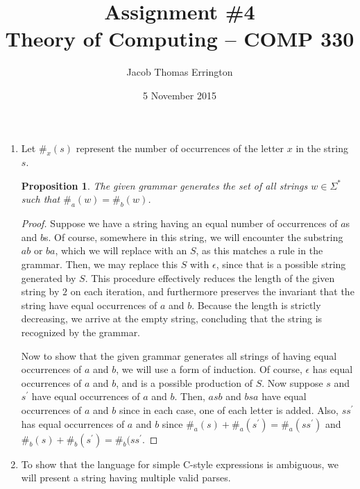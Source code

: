 \documentclass[letterpaper,11pt]{article}
\author{Jacob Thomas Errington}
\date{5 November 2015}
\title{Assignment \#4\\Theory of Computing -- COMP 330}
\newtheorem{proposition}{Proposition}
\begin{document}
\maketitle

\begin{enumerate}
    \item Let $\#_x(s)$ represent the number of occurrences of the letter $x$
        in the string $s$.

        \begin{proposition}
            The given grammar generates the set of all strings $w \in \Sigma^*$
            such that $\#_a(w) = \#_b(w)$.
        \end{proposition}

        \begin{proof}
            Suppose we have a string having an equal number of occurrences of
            $a$s and $b$s. Of course, somewhere in this string, we will
            encounter the substring $ab$ or $ba$, which we will replace with an
            $S$, as this matches a rule in the grammar. Then, we may replace
            this $S$ with $\epsilon$, since that is a possible string generated
            by $S$. This procedure effectively reduces the length of the given
            string by $2$ on each iteration, and furthermore preserves the
            invariant that the string have equal occurrences of $a$ and $b$.
            Because the length is strictly decreasing, we arrive at the empty
            string, concluding that the string is recognized by the grammar.

            Now to show that the given grammar generates all strings of having
            equal occurrences of $a$ and $b$, we will use a form of induction.
            Of course, $\epsilon$ has equal occurrences of $a$ and $b$, and is
            a possible production of $S$. Now suppose $s$ and $s^\prime$ have
            equal occurrences of $a$ and $b$. Then, $asb$ and $bsa$ have equal
            occurrences of $a$ and $b$ since in each case, one of each letter
            is added. Also, $ss^\prime$ has equal occurrences of $a$ and $b$
            since $\#_a(s) + \#_a(s^\prime) = \#_a(ss^\prime)$ and
            $\#_b(s) + \#_b(s^\prime) = \#_b(ss^\prime$.
        \end{proof}

    \item
        To show that the language for simple C-style expressions is ambiguous,
        we will present a string having multiple valid parses.


\end{enumerate}
\end{document}
